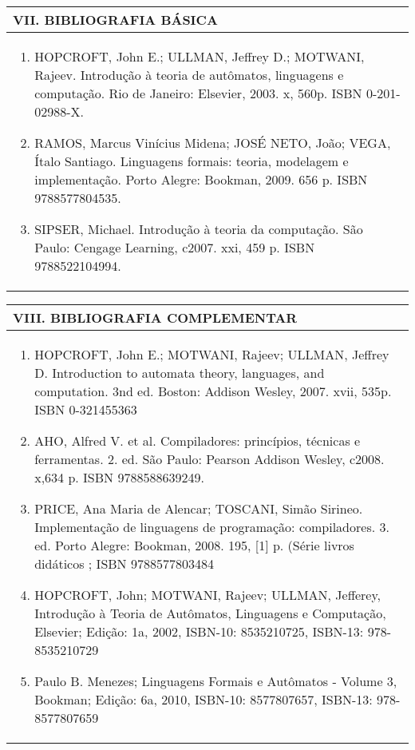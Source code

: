 \documentclass[12pt]{article}
\begin{document}
\begin{longtable}{|L{1.025\textwidth}|} \hline
%
{\bf VII. BIBLIOGRAFIA BÁSICA} \\ \hline
\begin{enumerate}
%
\item HOPCROFT, John E.; ULLMAN, Jeffrey D.; MOTWANI, Rajeev. Introdução à teoria de autômatos, linguagens e computação. Rio de Janeiro: Elsevier, 2003. x, 560p. ISBN 0-201-02988-X. 
\item RAMOS, Marcus Vinícius Midena; JOSÉ NETO, João; VEGA, Ítalo Santiago. Linguagens formais: teoria, modelagem e implementação. Porto Alegre: Bookman, 2009. 656 p. ISBN 9788577804535. 
\item SIPSER, Michael. Introdução à teoria da computação. São Paulo: Cengage Learning, c2007. xxi, 459 p. ISBN 9788522104994.
\end{enumerate}
 \\ \hline
\end{longtable}


\newpage

\begin{longtable}{|L{1.025\textwidth}|} \hline
%
{\bf VIII. BIBLIOGRAFIA COMPLEMENTAR} \\ \hline
\begin{enumerate}
\item HOPCROFT, John E.; MOTWANI, Rajeev; ULLMAN, Jeffrey D. Introduction to automata theory, languages, and computation. 3nd ed. Boston: Addison Wesley, 2007. xvii, 535p. ISBN 0-321455363 
\item AHO, Alfred V. et al. Compiladores: princípios, técnicas e ferramentas. 2. ed. São Paulo: Pearson Addison Wesley, c2008. x,634 p. ISBN 9788588639249. 
\item PRICE, Ana Maria de Alencar; TOSCANI, Simão Sirineo. Implementação de linguagens de programação: compiladores. 3. ed. Porto Alegre: Bookman, 2008. 195, [1] p. (Série livros didáticos ; ISBN 9788577803484

\item HOPCROFT, John; MOTWANI, Rajeev; ULLMAN, Jefferey, Introdução à Teoria de Autômatos, Linguagens e Computação, Elsevier; Edição: 1a, 2002, ISBN-10: 8535210725, ISBN-13: 978-8535210729

\item Paulo B. Menezes; Linguagens Formais e Autômatos - Volume 3, Bookman; Edição: 6a, 2010, ISBN-10: 8577807657, ISBN-13: 978-8577807659

\end{enumerate}
 \\ \hline
\end{longtable}



\end{document}
